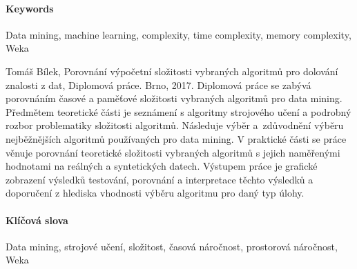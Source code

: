 \documentclass[12pt]{article}
\begin{document}
\paragraph{Keywords}
Data mining, machine learning, complexity, time complexity, memory complexity, Weka
\newline

\abstrakt
{Tomáš Bílek, Porovnání výpočetní složitosti vybraných algoritmů pro dolování znalosti z dat, Diplomová práce. Brno, 2017.}
{Diplomová práce se zabývá porovnáním časové a paměťové složitosti vybraných algoritmů pro data mining. 
\newline
\indent
Předmětem teoretické části je seznámení s algoritmy strojového učení a podrobný rozbor problematiky složitosti algoritmů. Následuje výběr a~zdůvodnění výběru nejběžnějších algoritmů používaných pro data mining. 
\newline
\indent
V praktické části se práce věnuje porovnání teoretické složitosti vybraných algoritmů s jejich naměřenými hodnotami na reálných a syntetických datech. 
\newline
\indent
Výstupem práce je grafické zobrazení výsledků testování, porovnání a interpretace těchto výsledků a doporučení z hlediska vhodnosti výběru algoritmu pro daný typ úlohy.}

\paragraph{Klíčová slova}
Data mining, strojové učení, složitost, časová náročnost, prostorová náročnost, Weka

\obsah
{}

\end{document}
